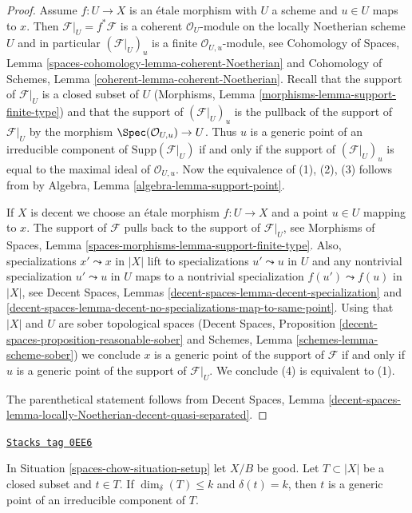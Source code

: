 \begin{proof}
Assume $f : U \to X$ is an \'etale morphism with $U$ a scheme
and $u \in U$ maps to $x$. Then $\mathcal{F}|_U = f^*\mathcal{F}$
is a coherent $\mathcal{O}_U$-module on the locally Noetherian
scheme $U$ and in particular $(\mathcal{F}|_U)_u$ is a finite
$\mathcal{O}_{U, u}$-module, see Cohomology of Spaces, Lemma
\ref{spaces-cohomology-lemma-coherent-Noetherian}
and Cohomology of Schemes, Lemma
\ref{coherent-lemma-coherent-Noetherian}.
Recall that the support of $\mathcal{F}|_U$ is a closed subset of $U$
(Morphisms, Lemma \ref{morphisms-lemma-support-finite-type}) and
that the support of $(\mathcal{F}|_U)_u$ is the pullback
of the support of $\mathcal{F}|_U$ by the morphism
$\Spec(\mathcal{O}_{U, u}) \to U$. Thus $u$ is a generic point
of an irreducible component of $\text{Supp}(\mathcal{F}|_U)$
if and only if the support of $(\mathcal{F}|_U)_u$ is equal
to the maximal ideal of $\mathcal{O}_{U, u}$.
Now the equivalence of (1), (2), (3) follows from
by Algebra, Lemma \ref{algebra-lemma-support-point}.

\medskip\noindent
If $X$ is decent we choose an \'etale morphism $f : U \to X$ and a point
$u \in U$ mapping to $x$. The support of $\mathcal{F}$ pulls back to
the support of $\mathcal{F}|_U$, see
Morphisms of Spaces, Lemma \ref{spaces-morphisms-lemma-support-finite-type}.
Also, specializations $x' \leadsto x$ in $|X|$ lift to specializations
$u' \leadsto u$ in $U$ and any nontrivial specialization $u' \leadsto u$ in $U$
maps to a nontrivial specialization $f(u') \leadsto f(u)$ in $|X|$, see
Decent Spaces, Lemmas
\ref{decent-spaces-lemma-decent-specialization} and
\ref{decent-spaces-lemma-decent-no-specializations-map-to-same-point}.
Using that $|X|$ and $U$ are sober topological spaces
(Decent Spaces, Proposition \ref{decent-spaces-proposition-reasonable-sober}
and
Schemes, Lemma \ref{schemes-lemma-scheme-sober}) we conclude
$x$ is a generic point of the support of $\mathcal{F}$
if and only if $u$ is a generic point of the support of
$\mathcal{F}|_U$. We conclude (4) is equivalent to (1).

\medskip\noindent
The parenthetical statement follows from Decent Spaces, Lemma
\ref{decent-spaces-lemma-locally-Noetherian-decent-quasi-separated}.
\end{proof}

\begin{lemma}
\label{spaces-chow-lemma-point-of-max-dimension}
\href{https://stacks.math.columbia.edu/tag/0EE6}{\texttt{Stacks tag 0EE6}}

In Situation \ref{spaces-chow-situation-setup} let $X/B$ be good.
Let $T \subset |X|$ be a closed subset and $t \in T$.
If $\dim_\delta(T) \leq k$ and $\delta(t) = k$, then
$t$ is a generic point of an irreducible component of $T$.
\end{lemma}

